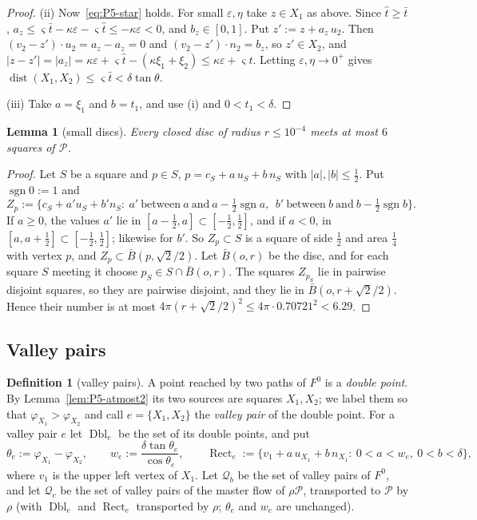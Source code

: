 \documentclass[11pt]{amsart}
\newcommand{\cP}{\mathcal P}
\newcommand{\dist}{\operatorname{dist}}
\newcommand{\Fz}{F^{0}}
\newtheorem{lemma}[theorem]{Lemma}
\theoremstyle{definition}
\newtheorem{definition}[theorem]{Definition}
\theoremstyle{remark}
\numberwithin{equation}{section}
\begin{document}
\begin{proof}
(ii) Now~\eqref{eq:P5-star} holds. For small $\varepsilon,\eta$ take $z\in X_1$ as above. Since $\hat t\ge\bar t$, $a_z\le\varsigma\bar t-\kappa\varepsilon-\varsigma\hat t\le-\kappa\varepsilon<0$, and $b_z\in[0,1]$. Put $z':=z+a_z\,u_2$. Then $(v_2-z')\cdot u_2=a_z-a_z=0$ and $(v_2-z')\cdot n_2=b_z$, so $z'\in X_2$, and $|z-z'|=|a_z|=\kappa\varepsilon+\varsigma\hat t-(\kappa\xi_1+\xi_2)\le\kappa\varepsilon+\varsigma\hat t$. Letting $\varepsilon,\eta\to0^+$ gives $\dist(X_1,X_2)\le\varsigma\bar t<\delta\tan\theta$.

(iii) Take $a=\xi_1$ and $b=t_1$, and use (i) and $0<t_1<\delta$.
\end{proof}

\begin{lemma}[small discs]\label{lem:P5-disc}
Every closed disc of radius $r\le10^{-4}$ meets at most $6$ squares of $\cP$.
\end{lemma}

\begin{proof}
Let $S$ be a square and $p\in S$, $p=c_S+a\,u_S+b\,n_S$ with $|a|,|b|\le\frac12$. Put $\operatorname{sgn}0:=1$ and
\[
Z_p:=\{c_S+a'u_S+b'n_S:\ a'\ \text{between}\ a\ \text{and}\ a-\tfrac12\operatorname{sgn}a,\ \ b'\ \text{between}\ b\ \text{and}\ b-\tfrac12\operatorname{sgn}b\}.
\]
If $a\ge0$, the values $a'$ lie in $[a-\frac12,a]\subset[-\frac12,\frac12]$, and if $a<0$, in $[a,a+\frac12]\subset[-\frac12,\frac12]$; likewise for $b'$. So $Z_p\subset S$ is a square of side $\frac12$ and area $\frac14$ with vertex $p$, and $Z_p\subset\bar B(p,\sqrt2/2)$. Let $\bar B(o,r)$ be the disc, and for each square $S$ meeting it choose $p_S\in S\cap\bar B(o,r)$. The squares $Z_{p_S}$ lie in pairwise disjoint squares, so they are pairwise disjoint, and they lie in $\bar B(o,r+\sqrt2/2)$. Hence their number is at most $4\pi(r+\sqrt2/2)^2\le4\pi\cdot0.70721^2<6.29$.
\end{proof}

\subsection{Valley pairs}\label{ssec:P5-valley}

\begin{definition}[valley pairs]\label{def:P5-valley}
A point reached by two paths of $\Fz$ is a \emph{double point}. By Lemma~\ref{lem:P5-atmost2} its two sources are squares $X_1,X_2$; we label them so that $\varphi_{X_1}>\varphi_{X_2}$ and call $e=\{X_1,X_2\}$ the \emph{valley pair} of the double point. For a valley pair $e$ let $\operatorname{Dbl}_e$ be the set of its double points, and put
\[
\theta_e:=\varphi_{X_1}-\varphi_{X_2},\qquad w_e:=\frac{\delta\tan\theta_e}{\cos\theta_e},\qquad
\operatorname{Rect}_e:=\{v_1+a\,u_{X_1}+b\,n_{X_1}:\ 0<a<w_e,\ 0<b<\delta\},
\]
where $v_1$ is the upper left vertex of $X_1$. Let $\mathcal Q_b$ be the set of valley pairs of $\Fz$, and let $\mathcal Q_c$ be the set of valley pairs of the master flow of $\rho\cP$, transported to $\cP$ by $\rho$ (with $\operatorname{Dbl}_e$ and $\operatorname{Rect}_e$ transported by $\rho$; $\theta_e$ and $w_e$ are unchanged).
\end{definition}
\end{document}
